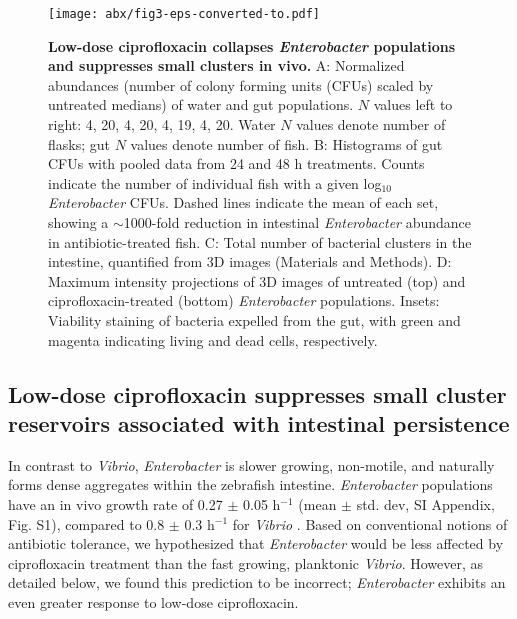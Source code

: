 \begin{figure*}[h]
\centerline{
	\texttt{[image: abx/fig3-eps-converted-to.pdf]}}
	\caption{\textbf{Low-dose ciprofloxacin collapses \textit{Enterobacter} populations and suppresses small clusters in vivo.} A: Normalized abundances (number of colony forming units (CFUs) scaled by untreated medians) of water and gut populations. $N$ values left to right: 4, 20, 4, 20, 4, 19, 4, 20. Water $N$ values denote number of flasks; gut $N$ values denote number of fish. B: Histograms of gut CFUs with pooled data from 24 and 48 h treatments. Counts indicate the number of individual fish with a given log$_{10}$ \textit{Enterobacter} CFUs. Dashed lines indicate the mean of each set, showing a $\sim$1000-fold reduction in intestinal \textit{Enterobacter} abundance in antibiotic-treated fish. C: Total number of bacterial clusters in the intestine, quantified from 3D images (Materials and Methods). D: Maximum intensity projections of 3D images of untreated (top) and ciprofloxacin-treated (bottom) \textit{Enterobacter} populations. Insets: Viability staining of bacteria expelled from the gut, with green and magenta indicating living and dead cells, respectively.}
\end{figure*}


\subsection*{Low-dose ciprofloxacin suppresses small cluster reservoirs associated with intestinal persistence}

In contrast to \textit{Vibrio}, \textit{Enterobacter} is slower growing, non-motile, and naturally forms dense aggregates within the zebrafish intestine. \textit{Enterobacter} populations have an in vivo growth rate of 0.27 $\pm$ 0.05 h$^{-1}$ (mean $\pm$ std. dev, SI Appendix, Fig. S1), compared to 0.8 $\pm$ 0.3 h$^{-1}$ for \textit{Vibrio} \cite{Wiles2016}. Based on conventional notions of antibiotic tolerance, we hypothesized that \textit{Enterobacter} would be less affected by ciprofloxacin treatment than the fast growing, planktonic \textit{Vibrio}. However, as detailed below, we found this prediction to be incorrect; \textit{Enterobacter} exhibits an even greater response  to low-dose ciprofloxacin.

